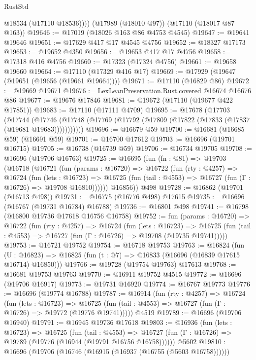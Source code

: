 \begin{lexlean}{RustStd}
\begin{coremodule}
          @18534
          (@17110 @18536))))
    (@17989 (@18010 @97))
    (@17110 (@18017 @87 @163))
@19646 := @17019 (@18026 @163 @86 @4753 @4545)
@19647 := @19641 @19646
@19651 := @17629 @417 @17 @4545 @4756
@19652 := @18327 @17173
@19653 := @19652 @4350
@19656 := @19653 @417 @17 @4756
@19658 := @17318 @416 @4756
@19660 := @17323 (@17324 @4756)
@19661 := @19658 @19660
@19664 := @17110 (@17329 @416 @17)
@19669 := @17929 (@19647 (@19651 (@19656 (@19661 @19664))))
@19671 := @17110 (@16829 @86)
@19672 := @19669 @19671
@19676 := LexLeanPreservation.Rust.covered @16674 @16676 @86
@19677 := @19676 @17846
@19681 := @19672 (@17110 (@19677 @422 @17851))
@19683 := @17110 (@17111 @4709)
@19695 := @17678
    (@17703
      (@17744
        (@17746 (@17748 (@17769 (@17792 (@17809 (@17822 (@17833 (@17837 (@19681 @19683)))))))))))
@19696 := @16679 @59
@19700 := @16681 (@16685 @59) (@16691 @59)
@19701 := @16700 @17612
@19703 := @16696 (@19701 @16715)
@19705 := @16738 (@16739 @59)
@19706 := @16734 @19705
@19708 := @16696 (@19706 @16763)
@19725 := @16695
    (fun (fn : @81) =>
    @19703
      (@16718
        (@16721
          (fun (params : @16720) =>
          @16722
            (fun (rty : @4257) =>
            @16724
              (fun (lets : @16723) =>
              @16725 (fun (tail : @4553) => @16727 (fun (Γ : @16726) => @19708 @16810))))))
        @16856))
    @498
@19728 := @16862 (@19701 (@16713 @498))
@19731 := @16775 (@16776 @498) @17615
@19735 := @16696 (@16767 (@19731 @16784) @16788)
@19736 := @16801 @498
@19741 := @16798 (@16800 @19736 @17618 @16756 @16758)
@19752 := fun (params : @16720) =>
  @16722
    (fun (rty : @4257) =>
    @16724
      (fun (lets : @16723) =>
      @16725 (fun (tail : @4553) => @16727 (fun (Γ : @16726) => @19708 (@19735 @19741)))))
@19753 := @16721 @19752
@19754 := @16718 @19753
@19763 := @16824
    (fun (U : @16823) => @16825 (fun (t : @7) => @16833 (@16696 (@16839 @17615 @16714) @16850)))
@19766 := @19728 (@19754 @19763) @17613
@19768 := @16681 @19753 @19763
@19770 := @16911 @19752 @4515
@19772 := @16696 (@19706 @16917)
@19773 := @19731 @16920
@19774 := @16767 @19773
@19776 := @16696 (@19774 @16788)
@19787 := @16914
    (fun (rty : @4257) =>
    @16724
      (fun (lets : @16723) =>
      @16725 (fun (tail : @4553) => @16727 (fun (Γ : @16726) => @19772 (@19776 @19741)))))
    @4519
@19789 := @16696 (@19706 @16940)
@19791 := @16945 @19736 @17618
@19803 := @16936
    (fun (lets : @16723) =>
    @16725
      (fun (tail : @4553) =>
      @16727 (fun (Γ : @16726) => @19789 (@19776 (@16944 (@19791 @16756 @16758))))))
    @5602
@19810 := @16696 (@19706 (@16746 (@16915 (@16937 (@16755 (@5603 @16758))))))

\end{coremodule}
\end{lexlean}
